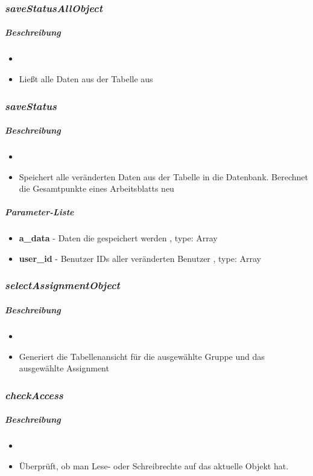 \subsubsection*{\textit{saveStatusAllObject}}\label{saveStatusAllObjectTGUI}
\subparagraph{Beschreibung}
\begin{itemize}
	\item[] \noindent{}
	\item[]  Ließt alle Daten aus der Tabelle aus
\end{itemize}

\subsubsection*{\textit{saveStatus}}\label{saveStatusTGUI}
\subparagraph{Beschreibung}
\begin{itemize}
	\item[] \noindent{}
	\item[]  Speichert alle veränderten Daten aus der Tabelle in die Datenbank. Berechnet die Gesamtpunkte eines Arbeitsblatts neu
\end{itemize}
\subparagraph{Parameter-Liste}
\begin{itemize}
	\item[] \textbf{a\_data} - Daten die gespeichert werden , type: Array
	\item[] \textbf{user\_id} - Benutzer IDs aller veränderten Benutzer , type: Array
\end{itemize}

\subsubsection*{\textit{selectAssignmentObject}}\label{selectAssignmentObjectTGUI}
\subparagraph{Beschreibung}
\begin{itemize}
	\item[] \noindent{}
	\item[]  Generiert die Tabellenansicht für die ausgewählte Gruppe und das ausgewählte Assignment
\end{itemize}

\subsubsection*{\textit{checkAccess}}\label{checkAccessTGUI}
\subparagraph{Beschreibung}
\begin{itemize}
	\item[] \noindent{}
	\item[] Überprüft, ob man Lese- oder Schreibrechte auf das aktuelle Objekt hat.
\end{itemize}